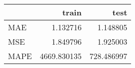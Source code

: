 \begin{tabular}{lrr}
\toprule
{} &        train &        test \\
\midrule
MAE  &     1.132716 &    1.148805 \\
MSE  &     1.849796 &    1.925003 \\
MAPE &  4669.830135 &  728.486997 \\
\bottomrule
\end{tabular}
